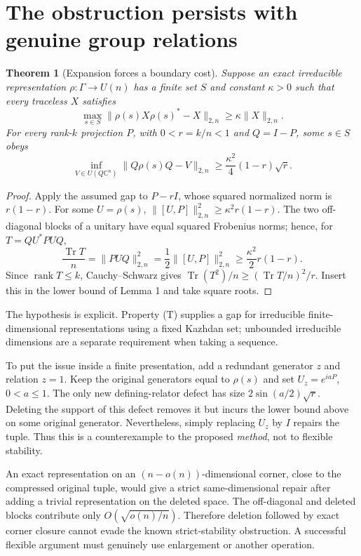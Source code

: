 \documentclass[11pt]{article}
\newtheorem{theorem}{Theorem}
\newcommand{\tr}{\operatorname{Tr}}
\newcommand{\rank}{\operatorname{rank}}
\begin{document}
\section{The obstruction persists with genuine group relations}
\begin{theorem}[Expansion forces a boundary cost]
Suppose an exact irreducible representation $\rho:\Gamma\to U(n)$ has a finite set $S$ and constant $\kappa>0$ such that every traceless $X$ satisfies
\[
\max_{s\in S}\|\rho(s)X\rho(s)^*-X\|_{2,n}\geq\kappa\|X\|_{2,n}.
\]
For every rank-$k$ projection $P$, with $0<r=k/n<1$ and $Q=I-P$, some $s\in S$ obeys
\[
\inf_{V\in U(Q\mathbb C^n)}\|Q\rho(s)Q-V\|_{2,n}
\geq\frac{\kappa^2}{4}(1-r)\sqrt r.
\]
\end{theorem}
\begin{proof}
Apply the assumed gap to $P-rI$, whose squared normalized norm is $r(1-r)$. For some $U=\rho(s)$,
$\|[U,P]\|_{2,n}^2\geq\kappa^2r(1-r)$.
The two off-diagonal blocks of a unitary have equal squared Frobenius norms; hence, for $T=QU^*PUQ$,
\[
\frac{\tr T}{n}=\|PUQ\|_{2,n}^2
=\frac12\|[U,P]\|_{2,n}^2
\geq\frac{\kappa^2}{2}r(1-r).
\]
Since $\rank T\leq k$, Cauchy--Schwarz gives
$\tr(T^2)/n\geq(\tr T/n)^2/r$.
Insert this in the lower bound of Lemma 1 and take square roots.
\end{proof}
The hypothesis is explicit. Property (T) supplies a gap for irreducible finite-dimensional representations using a fixed Kazhdan set; unbounded irreducible dimensions are a separate requirement when taking a sequence.

To put the issue inside a finite presentation, add a redundant generator $z$ and relation $z=1$. Keep the original generators equal to $\rho(s)$ and set $U_z=e^{iaP}$, $0<a\leq1$. The only new defining-relator defect has size $2\sin(a/2)\sqrt r$. Deleting the support of this defect removes it but incurs the lower bound above on some original generator. Nevertheless, simply replacing $U_z$ by $I$ repairs the tuple. Thus this is a counterexample to the proposed \emph{method}, not to flexible stability.

An exact representation on an $(n-o(n))$-dimensional corner, close to the compressed original tuple, would give a strict same-dimensional repair after adding a trivial representation on the deleted space. The off-diagonal and deleted blocks contribute only $O(\sqrt{o(n)/n})$. Therefore deletion followed by exact corner closure cannot evade the known strict-stability obstruction. A successful flexible argument must genuinely use enlargement or another operation.
\end{document}
